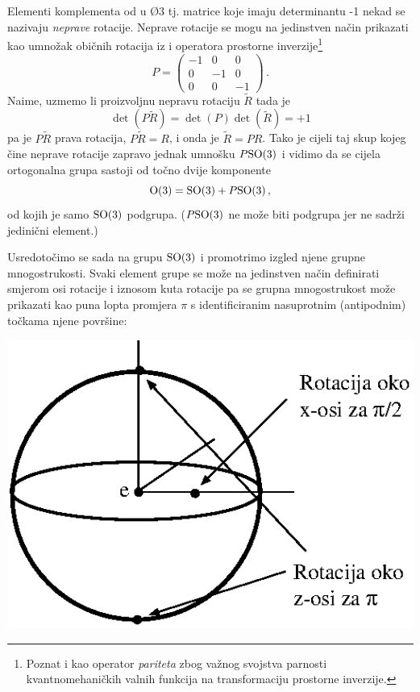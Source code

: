 Elementi komplementa od  u \O{3} tj. matrice koje imaju determinantu -1 nekad se 
nazivaju \emph{neprave} rotacije.
Neprave rotacije se mogu na jedinstven
način prikazati kao umnožak običnih rotacija iz  i operatora 
prostorne inverzije\footnote{Poznat i kao operator \emph{pariteta} zbog
    važnog svojstva parnosti kvantnomehaničkih valnih funkcija na transformaciju
prostorne inverzije.}
\begin{equation}
P = \begin{pmatrix}
-1 & 0 & 0 \\ 
0  &-1 & 0 \\
0  & 0 & -1
\end{pmatrix} \,.
\end{equation}
Naime, uzmemo li proizvoljnu nepravu rotaciju $\tilde{R}$ tada
je 
\begin{equation}
\det (P \tilde{R}) = \det(P) \det(\tilde{R}) = +1     
\end{equation}
pa je $P\tilde{R}$ 
prava rotacija, $P\tilde{R} = R$,
i onda je $\tilde{R} = P R$. Tako je cijeli taj skup
kojeg čine neprave rotacije zapravo jednak umnošku $P\mathrm{SO}(3)$ i vidimo da
se cijela ortogonalna grupa sastoji od točno dvije komponente
\begin{equation}
    \mathrm{O}(3) = \mathrm{SO}(3) + P\mathrm{SO}(3)\,,
    \label{eq:so3Pso3}
\end{equation}
od kojih je samo $\mathrm{SO}(3)$ podgrupa. ($P\mathrm{SO}(3)$ ne može biti podgrupa jer ne sadrži
jedinični element.)

Usredotočimo se sada na grupu $\mathrm{SO}(3)$ i promotrimo izgled njene grupne mnogostrukosti.
Svaki element grupe  se može na jedinstven način definirati
smjerom osi rotacije i iznosom kuta rotacije pa se grupna mnogostrukost
može prikazati kao puna lopta promjera $\pi$ s identificiranim nasuprotnim
(antipodnim) točkama njene površine:

\centerline{\includegraphics[scale=0.8]{pics/so3mnogostrukost.eps}}


